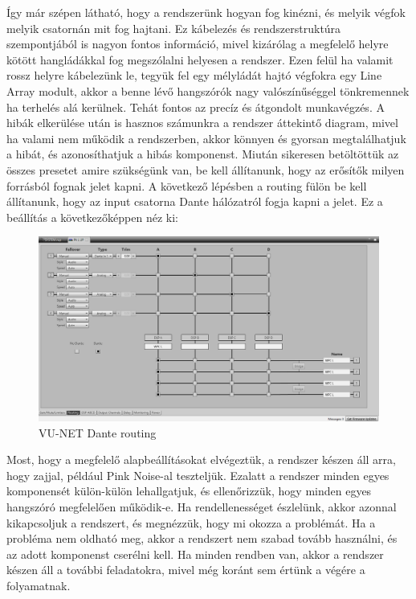 Így már szépen látható, hogy a rendszerünk hogyan fog kinézni, és melyik végfok melyik csatornán mit fog hajtani.
Ez kábelezés és rendszerstruktúra szempontjából is nagyon fontos információ, mivel kizárólag a megfelelő helyre
kötött hangládákkal fog megszólalni helyesen a rendszer. Ezen felül ha valamit rossz helyre kábelezünk le, tegyük fel egy
mélyládát hajtó végfokra egy Line Array modult, akkor a benne lévő hangszórók nagy valószínűséggel tönkremennek ha terhelés alá kerülnek.
Tehát fontos az precíz és átgondolt munkavégzés. A hibák elkerülése után is hasznos számunkra a rendszer áttekintő diagram,
mivel ha valami nem működik a rendszerben, akkor könnyen és gyorsan megtalálhatjuk a hibát, és azonosíthatjuk a hibás komponenst.
Miután sikeresen betöltöttük az összes presetet amire szükségünk van, be kell állítanunk, hogy az erősítők milyen forrásból
fognak jelet kapni. A következő lépésben a routing fülön be kell állítanunk, hogy az input csatorna Dante hálózatról fogja kapni a jelet.
Ez a beállítás a következőképpen néz ki:
\begin{figure}[H]
	\centering
	\includegraphics[width=\textwidth, keepaspectratio]{figures/vunet_routing_dante.png}
	\caption{VU-NET Dante routing}\label{fig:vunet_routing_dante}
\end{figure}
Most, hogy a megfelelő alapbeállításokat elvégeztük, a rendszer készen áll arra, hogy zajjal, például
Pink Noise-al teszteljük. Ezalatt a rendszer minden egyes komponensét külön-külön lehallgatjuk, és ellenőrizzük,
hogy minden egyes hangszóró megfelelően működik-e. Ha rendellenességet észlelünk, akkor azonnal kikapcsoljuk a rendszert,
és megnézzük, hogy mi okozza a problémát. Ha a probléma nem oldható meg, akkor a rendszert nem szabad tovább használni,
és az adott komponenst cserélni kell. Ha minden rendben van, akkor a rendszer készen áll a további feladatokra, mivel
még koránt sem értünk a végére a folyamatnak.
